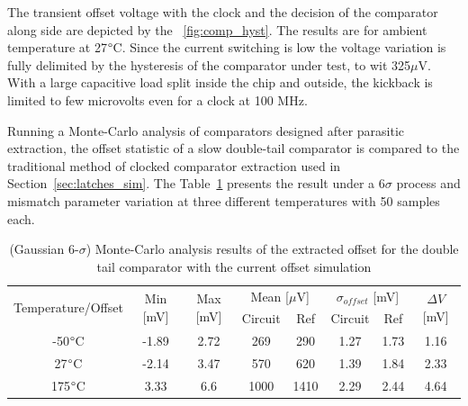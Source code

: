 The transient offset voltage with the clock and the decision of the comparator along side are depicted by the \figurename~\ref{fig:comp_hyst}. The results are for ambient temperature at 27$\degree$C. Since the current switching is low the voltage variation is fully delimited by the hysteresis of the comparator under test, to wit 325$\mu$V. With a large capacitive load split inside the chip and outside, the kickback is limited to few microvolts even for a clock at 100 MHz.

Running a Monte-Carlo analysis of comparators designed after parasitic extraction, the offset statistic of a slow double-tail comparator is compared to the traditional method of clocked comparator extraction used in Section~\ref{sec:latches_sim}. The Table~\ref{tbl:offset_fb_dtl_post_layout} presents the result under a 6$\sigma$ process and mismatch parameter variation at three different temperatures with 50 samples each.

\begin{table}[htp]
    \centering
    \caption{(Gaussian 6-$\sigma$) Monte-Carlo analysis results of the extracted offset for the double tail comparator with the current offset simulation}
    \label{tbl:offset_fb_dtl_post_layout}
    \begin{tabular}{cccccccc}
    \hline
    \multirow{2}{*}{Temperature/Offset} & \multirow{2}{*}{Min {[}mV{]}} & \multirow{2}{*}{Max {[}mV{]}} & \multicolumn{2}{c}{Mean {[}$\mu$V{]}} & \multicolumn{2}{c}{$\sigma_{offset}$ {[}mV{]}} & \multirow{2}{*}{$\Delta V$ {[}mV{]}} \\
                                        &                               &                               & Circuit           & Ref            & Circuit                 & Ref                  &                                   \\ \hline
    -50$\degree$C                          & -1.89                         & 2.72                          & 269               & 290            & 1.27                    & 1.73                 & 1.16                              \\
    27$\degree$C                           & -2.14                         & 3.47                          & 570               & 620            & 1.39                    & 1.84                 & 2.33                              \\
    175$\degree$C                          & 3.33                          & 6.6                           & 1000              & 1410           & 2.29                    & 2.44                 & 4.64                              \\ \hline
    \end{tabular}
\end{table}

